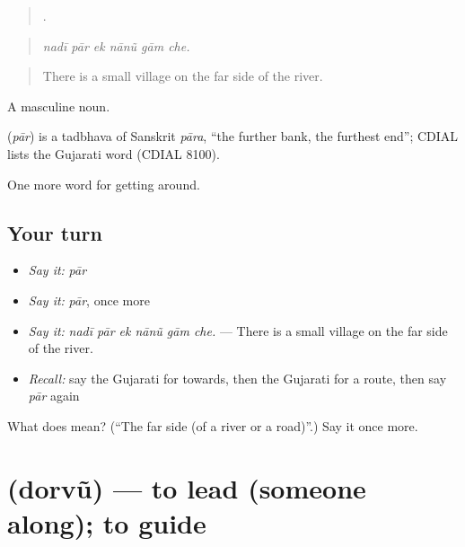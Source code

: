 \begin{quote}
     .
\end{quote}

\begin{quote}
\emph{nadī pār ek nānũ gām che.}
\end{quote}

\begin{quote}
There is a small village on the far side of the river.
\end{quote}

A masculine noun.

\begin{cousinweb}
\textbf{} (\emph{pār}) is a tadbhava of Sanskrit \emph{pāra}, \textquotedblleft{}the further bank, the furthest end\textquotedblright{}; CDIAL lists the Gujarati word (CDIAL 8100).
\end{cousinweb}

\begin{grammarlens}[title={What you've built}]
One more word for getting around.
\end{grammarlens}

\subsection*{Your turn}
\begin{itemize}
\raggedright
  \item \emph{Say it:} \emph{pār}
  \item \emph{Say it:} \emph{pār}, once more
  \item \emph{Say it:} \emph{nadī pār ek nānũ gām che.} — There is a small village on the far side of the river.
  \item \emph{Recall:} say the Gujarati for towards, then the Gujarati for a route, then say \emph{pār} again
\end{itemize}

\begin{tcolorbox}[breakable,colback=teal!4,colframe=teal!35!black,title={Before you move on}]
What does  mean? (\textquotedblleft{}The far side (of a river or a road)\textquotedblright{}.) Say it once more.
\end{tcolorbox}
\section[\texorpdfstring{\gu{દોરવું} (dorvũ)}{દોરવું (dorvũ)}]{ (dorvũ) — to lead (someone along); to guide}


